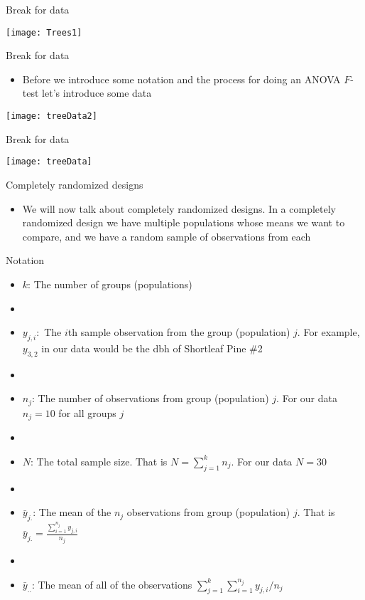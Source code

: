 \documentclass[xcolor=dvipsnames]{beamer}
\begin{document}
\begin{frame}{Break for data}
	\begin{center}
		\texttt{[image: Trees1]}
	\end{center}
\end{frame}

\begin{frame}{Break for data}
	\begin{itemize}
		\item Before we introduce some notation and the process for doing an ANOVA $F$-test let's introduce some data
	\end{itemize}
\begin{center}
	\texttt{[image: treeData2]}
\end{center}
\end{frame}

\begin{frame}{Break for data}
	\begin{center}
		\texttt{[image: treeData]}
	\end{center}
\end{frame}

\begin{frame}{Completely randomized designs}
	\begin{itemize}
		\item We will now talk about completely randomized designs. In a completely randomized design we have multiple populations whose means we want to compare, and we have a random sample of observations from each
	\end{itemize}
\end{frame}

\begin{frame}{Notation}
	\begin{itemize}
		\item $k$: The number of groups (populations)
		\item[]
		\item $y_{j,i}:$ The $i$th sample observation from the group (population) $j$. For example, $y_{3,2}$ in our data would be the dbh of Shortleaf Pine \#2
		\item[]
		\item $n_j$: The number of observations from group (population) $j$. For our data $n_j=10$ for all groups $j$
		\item[]
		\item $N$: The total sample size. That is $N = \sum_{j=1}^{k} n_j$. For our data $N = 30$
		\item[]
		\item $\bar{y}_{j.}$: The mean of the $n_j$ observations from group (population) $j$. That is $\bar{y}_{j.} = \frac{\sum_{i = 1}^{n_j} y_{j,i}}  {n_j}$
		\item[]
		\item $\bar{y}_{..}$: The mean of all of the observations $\sum_{j=1}^k\sum_{i = 1}^{n_j} y_{j,i} / n_j$
	\end{itemize}
\end{frame}
\end{document}

